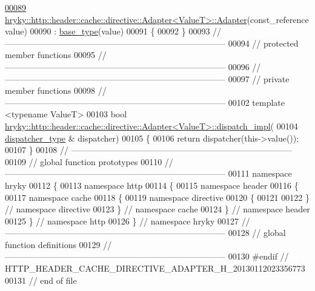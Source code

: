 \begin{DoxyCode}
\hypertarget{http__header__cache__directive__adapter_8h_source_l00089}{}\hyperlink{classhryky_1_1http_1_1header_1_1cache_1_1directive_1_1_adapter_add9ee143d847a437e326b90f73f9736b}{00089} \hyperlink{classhryky_1_1_adapter_aad569390e8fc9963c8849cbd0c59bea9}{hryky::http::header::cache::directive::Adapter<ValueT>::Adapter}(const\_reference
       value)
00090     : \hyperlink{classhryky_1_1_adapter}{base_type}(value)
00091 \{
00092 \}
00093 \textcolor{comment}{//
      ------------------------------------------------------------------------------}
00094 \textcolor{comment}{// protected member functions}
00095 \textcolor{comment}{//
      ------------------------------------------------------------------------------}
00096 \textcolor{comment}{//
      ------------------------------------------------------------------------------}
00097 \textcolor{comment}{// private member functions}
00098 \textcolor{comment}{//
      ------------------------------------------------------------------------------}
00102 \textcolor{comment}{}\textcolor{keyword}{template} <\textcolor{keyword}{typename} ValueT>
00103 \textcolor{keywordtype}{bool} \hyperlink{classhryky_1_1http_1_1header_1_1cache_1_1directive_1_1_adapter}{hryky::http::header::cache::directive::Adapter<ValueT>::dispatch_impl}(
00104     \hyperlink{classhryky_1_1http_1_1header_1_1cache_1_1directive_1_1dispatcher_1_1_base}{dispatcher_type} & dispatcher)
00105 \{
00106     \textcolor{keywordflow}{return} dispatcher(this->value());
00107 \}
00108 \textcolor{comment}{//
      ------------------------------------------------------------------------------}
00109 \textcolor{comment}{// global function prototypes}
00110 \textcolor{comment}{//
      ------------------------------------------------------------------------------}
00111 \textcolor{keyword}{namespace }hryky
00112 \{
00113 \textcolor{keyword}{namespace }http
00114 \{
00115 \textcolor{keyword}{namespace }header
00116 \{
00117 \textcolor{keyword}{namespace }cache
00118 \{
00119 \textcolor{keyword}{namespace }directive
00120 \{
00121 
00122 \} \textcolor{comment}{// namespace directive}
00123 \} \textcolor{comment}{// namespace cache}
00124 \} \textcolor{comment}{// namespace header}
00125 \} \textcolor{comment}{// namespace http}
00126 \} \textcolor{comment}{// namespace hryky}
00127 \textcolor{comment}{//
      ------------------------------------------------------------------------------}
00128 \textcolor{comment}{// global function definitions}
00129 \textcolor{comment}{//
      ------------------------------------------------------------------------------}
00130 \textcolor{preprocessor}{#endif // HTTP\_HEADER\_CACHE\_DIRECTIVE\_ADAPTER\_H\_20130112023356773}
00131 \textcolor{preprocessor}{}\textcolor{comment}{// end of file}
\end{DoxyCode}
